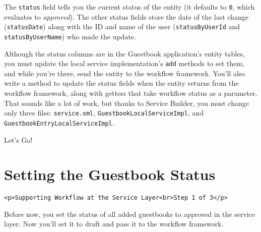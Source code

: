 The \texttt{status} field tells you the current status of the entity (it
defaults to \texttt{0}, which evaluates to \emph{approved}). The other
status fields store the date of the last change (\texttt{statusDate})
along with the ID and name of the user (\texttt{statusByUserId} and
\texttt{statusByUserName}) who made the update.

Although the status columns are in the Guestbook application's entity
tables, you must update the local service implementation's \texttt{add}
methods to set them, and while you're there, send the entity to the
workflow framework. You'll also write a method to update the status
fields when the entity returns from the workflow framework, along with
getters that take workflow status as a parameter. That sounds like a lot
of work, but thanks to Service Builder, you must change only three
files: \texttt{service.xml}, \texttt{GuestbookLocalServiceImpl}, and
\texttt{GuestbookEntryLocalServiceImpl}.

Let's Go!{}

\chapter{Setting the Guestbook
Status}\label{setting-the-guestbook-status}

\begin{verbatim}
<p>Supporting Workflow at the Service Layer<br>Step 1 of 3</p>
\end{verbatim}

Before now, you set the status of all added guestbooks to approved in
the service layer. Now you'll set it to draft and pass it to the
workflow framework.

